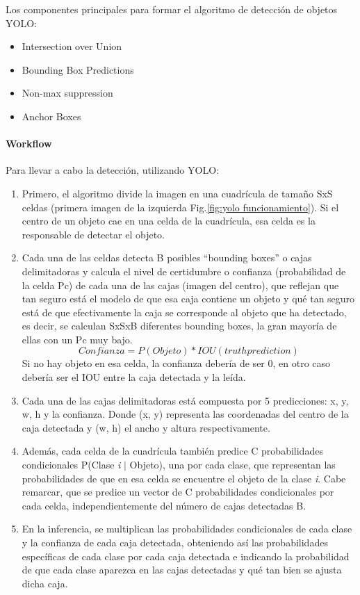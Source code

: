 Los componentes principales para formar el algoritmo de detección de objetos YOLO:
    \begin{itemize}
         \item Intersection over Union
         \item Bounding Box Predictions
         \item Non-max suppression
         \item Anchor Boxes
    \end{itemize}

\paragraph{Workflow}
Para llevar a cabo la detección, utilizando YOLO:
\begin{enumerate}
    \item Primero, el algoritmo divide la imagen en una cuadrícula de tamaño SxS celdas (primera imagen de la izquierda Fig.\ref{fig:yolo funcionamiento}). Si el centro de un objeto cae en una celda de la cuadrícula, esa celda es la responsable de detectar el objeto.\\
    \item Cada una de las celdas detecta B posibles “bounding boxes” o cajas delimitadoras y calcula el nivel de certidumbre o confianza (probabilidad de la celda Pc) de cada una de las cajas (imagen del centro), que reflejan que tan seguro está el modelo de que esa caja contiene un objeto y qué tan seguro está de que efectivamente la caja se corresponde al objeto que ha detectado, es decir, se calculan SxSxB diferentes bounding boxes, la gran mayoría de ellas con un Pc muy bajo.
    \[Confianza = P(Objeto) * IOU (truth prediction)\] Si no hay objeto en esa celda, la confianza debería de ser 0, en otro caso debería ser el IOU entre la caja detectada y la leída.\\
    \item Cada una de las cajas delimitadoras está compuesta por 5 predicciones: x, y, w, h y la confianza. Donde (x, y) representa las coordenadas del centro de la caja detectada y (w, h) el ancho y altura respectivamente.\\
    \item Además, cada celda de la cuadrícula también predice C probabilidades condicionales P(Clase \textit{i} $|$ Objeto), una por cada clase, que representan las probabilidades de que en esa celda se encuentre el objeto de la clase \textit{i}. Cabe remarcar, que se predice un vector de C probabilidades condicionales por cada celda, independientemente del número de cajas detectadas B.\\
    \item
    En la inferencia, se multiplican las probabilidades condicionales de cada clase y la confianza de cada caja detectada, obteniendo así las probabilidades específicas de cada clase por cada caja detectada e indicando la probabilidad de que cada clase aparezca en las cajas detectadas y qué tan bien se ajusta dicha caja.
\end{enumerate}


